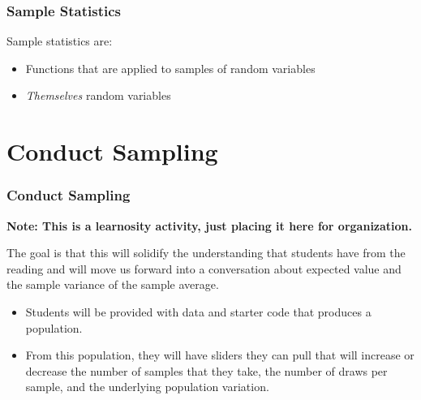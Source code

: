 \documentclass[12pt, block=fill]{beamer}
\begin{document}
\begin{frame}
  \frametitle{Sample Statistics}
  Sample statistics are:
  \begin{itemize}
  \item Functions that are applied to samples of random variables
       
  \item \textit{Themselves} random variables
  \end{itemize}
\end{frame}

\section{Conduct Sampling}

\begin{frame}
  \frametitle{Conduct Sampling}
  \textbf{Note: This is a learnosity activity, just placing it here
    for organization.}

  The goal is that this will solidify the understanding that students
  have from the reading and will move us forward into a conversation
  about expected value and the sample variance of the sample average.
  
  \begin{itemize}
  \item Students will be provided with data and starter code that
    produces a population. 
  \item From this population, they will have sliders they can
    pull that will increase or decrease the number of samples that
    they take, the number of draws per sample, and the underlying
    population variation.
  \end{itemize}
  
\end{frame}
\end{document}
